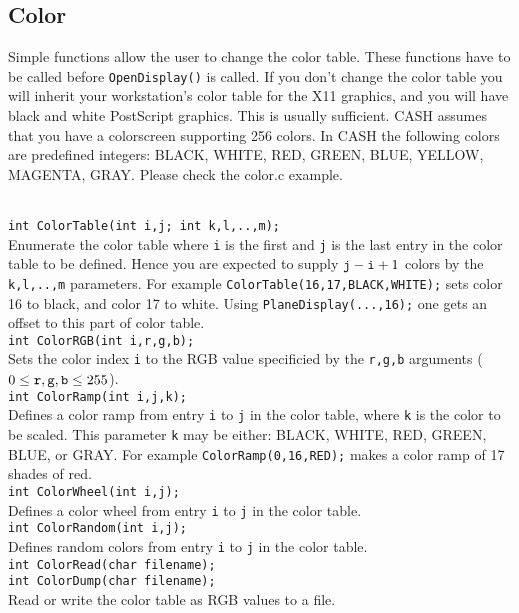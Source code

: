 \documentclass[12pt]{article}
\newcommand{\mtt}[1]{\texttt{\\#1\\}}
\begin{document}
\subsection{Color}
Simple functions allow the user to change the color table.
These functions have to be called before {\tt OpenDisplay()}
is called. If you don't change the color table you will
inherit your workstation's color table for the X11 graphics,
and you will have black and white PostScript graphics.
This is usually sufficient.
CASH assumes that you have a colorscreen supporting 256 colors.
In CASH the following colors are predefined integers:
BLACK, WHITE, RED, GREEN, BLUE, YELLOW, MAGENTA, GRAY.
Please check the color.c example.

\mtt{ int ColorTable(int i,j; int k,l,..,m);}
Enumerate the color table 
where {\tt i} is the first and {\tt j} is the last
entry in the color table to be defined.
Hence you are expected to supply ${\tt j}-{\tt i}+1$ colors
by the {\tt k,l,..,m} parameters.
For example {\tt ColorTable(16,17,BLACK,WHITE);} 
sets color 16 to black, and color 17 to white.
Using {\tt PlaneDisplay(...,16);} one gets an offset to this
part of color table.
\mtt{ int ColorRGB(int i,r,g,b);}
Sets the color index {\tt i} to the RGB value specificied
by the {\tt r,g,b} arguments ($0 \le {\tt r,g,b} \le 255$).
\mtt{ int ColorRamp(int i,j,k);}
Defines a color ramp from entry  {\tt i} to {\tt j} in the color table,
where {\tt k} is the color to be scaled. 
This parameter {\tt k} may be either: BLACK, WHITE, RED, GREEN, BLUE, or GRAY.
For example {\tt ColorRamp(0,16,RED);} makes a color ramp
of 17 shades of red.
\mtt{ int ColorWheel(int i,j);}
Defines a color wheel from entry  {\tt i} to {\tt j} in the color table.
\mtt{ int ColorRandom(int i,j);}
Defines random colors from entry  {\tt i} to {\tt j} in the color table.
\mtt{ 
int ColorRead(char filename);\\
int ColorDump(char filename);
}
Read or write the color table as RGB values to a file.
\end{document}
